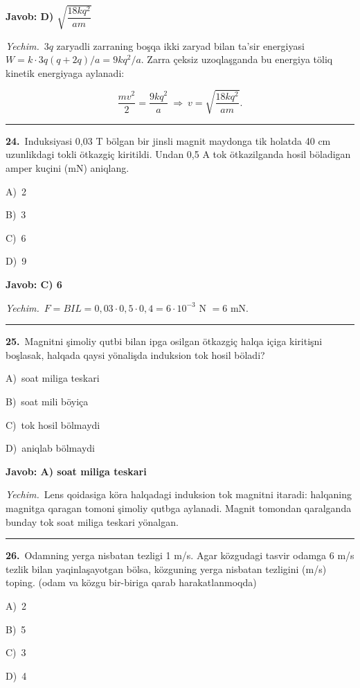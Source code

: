 \documentclass[11pt,a4paper]{article}
\newcommand{\opt}[2]{\hspace*{4mm}#1)\ #2\par}
\begin{document}
\noindent\colorbox{gray!12}{\parbox{\dimexpr\linewidth-2\fboxsep}{\textbf{Javob: D) $\sqrt{\dfrac{18kq^2}{am}}$}}}\par\smallskip
\noindent\textit{Yechim.}\ $3q$ zaryadli zarraning boşqa ikki zaryad bilan ta’sir energiyasi $W=k\cdot3q(q+2q)/a=9kq^2/a$. Zarra çeksiz uzoqlaşganda bu energiya töliq kinetik energiyaga aylanadi:\par
\[\frac{mv^2}{2}=\frac{9kq^2}{a}\ \Rightarrow\ v=\sqrt{\frac{18kq^2}{am}}.\]\par\medskip\hrule\medskip
{}\noindent\begin{minipage}{\linewidth}
\textbf{24.}\ Induksiyasi 0,03 T bölgan bir jinsli magnit maydonga tik holatda 40 cm uzunlikdagi tokli ötkazgiç kiritildi. Undan 0,5 A tok ötkazilganda hosil böladigan amper kuçini (mN) aniqlang.\par\smallskip
\opt{A}{2}
\opt{B}{3}
\opt{C}{6}
\opt{D}{9}
\end{minipage}\vspace{2pt}\par
\noindent\colorbox{gray!12}{\parbox{\dimexpr\linewidth-2\fboxsep}{\textbf{Javob: C) 6}}}\par\smallskip
\noindent\textit{Yechim.}\ $F=BIL=0{,}03\cdot0{,}5\cdot0{,}4=6\cdot10^{-3}$ N $=6$ mN.\par\par\medskip\hrule\medskip
{}\noindent\begin{minipage}{\linewidth}
\textbf{25.}\ Magnitni şimoliy qutbi bilan ipga osilgan ötkazgiç halqa içiga kiritişni boşlasak, halqada qaysi yönalişda induksion tok hosil böladi?\par\smallskip
\opt{A}{soat miliga teskari}
\opt{B}{soat mili böyiça}
\opt{C}{tok hosil bölmaydi}
\opt{D}{aniqlab bölmaydi}
\end{minipage}\vspace{2pt}\par
\noindent\colorbox{gray!12}{\parbox{\dimexpr\linewidth-2\fboxsep}{\textbf{Javob: A) soat miliga teskari}}}\par\smallskip
\noindent\textit{Yechim.}\ Lens qoidasiga köra halqadagi induksion tok magnitni itaradi: halqaning magnitga qaragan tomoni şimoliy qutbga aylanadi. Magnit tomondan qaralganda bunday tok soat miliga teskari yönalgan.\par\par\medskip\hrule\medskip
{}\noindent\begin{minipage}{\linewidth}
\textbf{26.}\ Odamning yerga nisbatan tezligi 1 m/s. Agar közgudagi tasvir odamga 6 m/s tezlik bilan yaqinlaşayotgan bölsa, közguning yerga nisbatan tezligini (m/s) toping. (odam va közgu bir-biriga qarab harakatlanmoqda)\par\smallskip
\opt{A}{2}
\opt{B}{5}
\opt{C}{3}
\opt{D}{4}
\end{minipage}\vspace{2pt}\par
\end{document}
